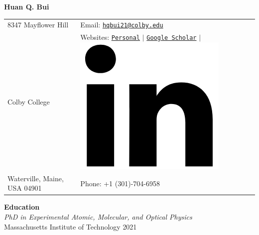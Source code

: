 \documentclass[10pt]{article}
\begin{document}
\noindent  
\begin{center}
{\Huge{\textbf{Huan Q. Bui}}}
\end{center}
\vspace{-10pt}
\hrulefill
\vspace{-1ex}

\normalsize







\begin{center}
\begin{tabular}{l l}
     8347 Mayflower Hill 		 & \hspace{1in} Email: \href{mailto:hqbui21@colby.edu}{\texttt{hqbui21@colby.edu}} \\
     Colby College 				 & \hspace{1in}  Websites: \href{www.huanqbui.com}{\texttt{Personal}} 
     $\vert$ 	\href{https://scholar.google.com/citations?user=ejxM5pkAAAAJ\&hl=en}{\texttt{Google Scholar}} 
     $\vert$ 					\href{https://www.linkedin.com/in/huan-bui/}{\includegraphics[scale=0.04]{linkedin_logo.PNG}} \\
 	Waterville, Maine, USA 04901 & \hspace{1in} Phone: +1 (301)-704-6958\\
\end{tabular}
\end{center}



\noindent\large{\textbf{{Education}}} \normalsize\\
\noindent \textit{PhD in Experimental Atomic, Molecular, and Optical Physics} \\
Massachusetts Institute of Technology \hfill {2021\textendash}\\
\end{document}
